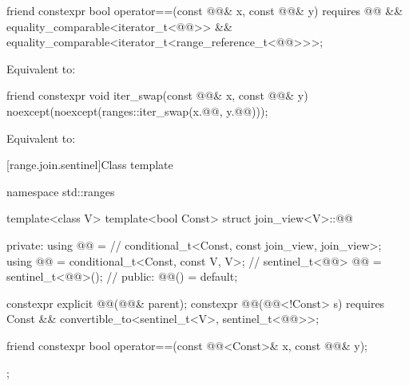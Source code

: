%
\begin{itemdecl}
friend constexpr bool operator==(const @@& x, const @@& y)
  requires @@ && equality_comparable<iterator_t<@@>> &&
           equality_comparable<iterator_t<range_reference_t<@@>>>;
\end{itemdecl}

\begin{itemdescr}
\pnum
\effects
Equivalent to:
\end{itemdescr}

%
\begin{itemdecl}
friend constexpr void iter_swap(const @@& x, const @@& y)
  noexcept(noexcept(ranges::iter_swap(x.@@, y.@@)));
\end{itemdecl}

\begin{itemdescr}
\pnum
\effects
Equivalent to: 
\end{itemdescr}

[range.join.sentinel]{Class template }

%
\begin{codeblock}
namespace std::ranges {
  template<class V>
  template<bool Const>
  struct join_view<V>::@@ {
  private:
    using @@ =                                      // \expos
      conditional_t<Const, const join_view, join_view>;
    using @@   = conditional_t<Const, const V, V>;    // \expos
    sentinel_t<@@> @@ = sentinel_t<@@>();         // \expos
  public:
    @@() = default;

    constexpr explicit @@(@@& parent);
    constexpr @@(@@<!Const> s)
      requires Const && convertible_to<sentinel_t<V>, sentinel_t<@@>>;

    friend constexpr bool operator==(const @@<Const>& x, const @@& y);
  };
}
\end{codeblock}

